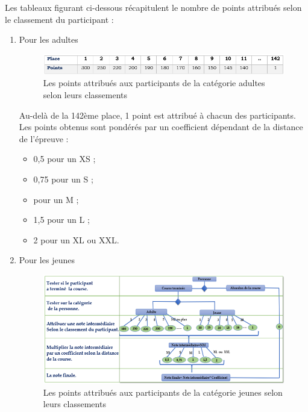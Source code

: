 \documentclass[12pt,a4paper]{report}
\begin{document}
	Les tableaux figurant ci-dessous récapitulent le nombre de points attribués selon le classement du participant :
	\begin{enumerate}
	   \item Pour les adultes
	\begin{figure}[h!]
	   \center
	   \includegraphics[scale=1]{img/points_categorie_adultes.png}
	   \caption {Les points attribués aux participants de la catégorie adultes selon leurs classements}
	\end{figure}
	
	Au-delà de la 142ème place, 1 point est attribué à chacun des participants. Les points obtenus sont pondérés par un coefficient dépendant de la distance de l’épreuve : 
	
	\begin{itemize} 
	 	\item 0,5 pour un XS ; 
	 	\item 0,75 pour un S ;
	 	\item  pour un M ; 
	 	\item 1,5 pour un L ;
	 	\item 2 pour un XL ou XXL.
	\end{itemize} 
	   \item Pour les jeunes
	\begin{figure}[!h]
	   \center
	   \includegraphics[scale=0.9]{img/points_categorie_jeunes.png}
	   \caption {Les points attribués aux participants de la catégorie jeunes selon leurs classements}
	\end{figure}
	
	\end{enumerate}
\end{document}
